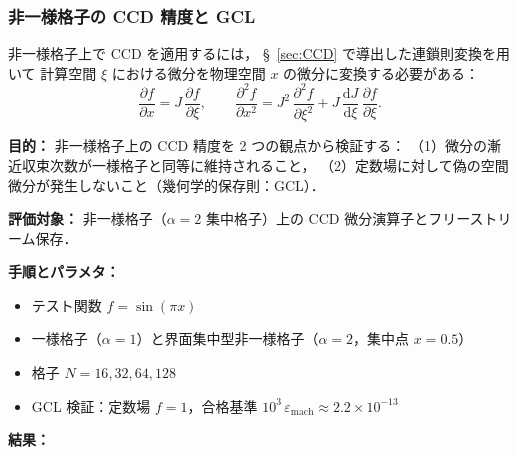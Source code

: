 \subsubsection{非一様格子の CCD 精度と GCL}
\label{sec:gcl_verification}

非一様格子上で CCD を適用するには，
§~\ref{sec:CCD} で導出した連鎖則変換を用いて
計算空間 $\xi$ における微分を物理空間 $x$ の微分に変換する必要がある：
\begin{equation}
  \frac{\partial f}{\partial x} = J\,\frac{\partial f}{\partial\xi}, \qquad
  \frac{\partial^2 f}{\partial x^2}
    = J^2\,\frac{\partial^2 f}{\partial\xi^2}
      + J\,\frac{\mathrm{d}J}{\mathrm{d}\xi}\,\frac{\partial f}{\partial\xi}.
  \label{eq:gcl_chain}
\end{equation}

\noindent\textbf{目的：}
非一様格子上の CCD 精度を 2 つの観点から検証する：
（1）微分の漸近収束次数が一様格子と同等に維持されること，
（2）定数場に対して偽の空間微分が発生しないこと（幾何学的保存則：GCL）．

\noindent\textbf{評価対象：}
非一様格子（$\alpha=2$ 集中格子）上の CCD 微分演算子とフリーストリーム保存．

\noindent\textbf{手順とパラメタ：}
\begin{itemize}[noitemsep]
  \item テスト関数 $f = \sin(\pi x)$
  \item 一様格子（$\alpha=1$）と界面集中型非一様格子（$\alpha=2$，集中点 $x = 0.5$）
  \item 格子 $N = 16, 32, 64, 128$
  \item GCL 検証：定数場 $f = 1$，合格基準 $10^3\,\varepsilon_\mathrm{mach} \approx 2.2 \times 10^{-13}$
\end{itemize}

\noindent\textbf{結果：}

